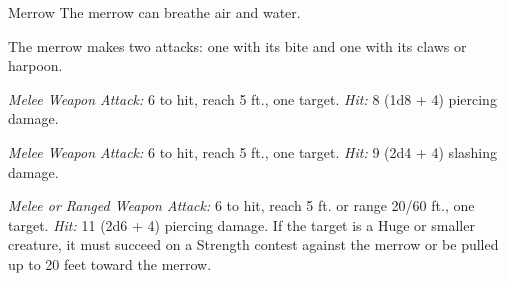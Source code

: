 \documentclass[10pt,a4paper,twoside,bg=print,twocolumn,openany,nodeprecatedcode]{dndbook}
\begin{document}
\begin{DndMonster}[float=t]{Merrow}
\DndMonsterBasics[
armor-class = {13 (natural armor)},
hit-points = {\DndDice{6d10 + 12}},
speed = {10 ft., swim 40 ft.}
]
\DndMonsterAbilityScores[
 str = 18,
 dex = 10,
 con = 15,
 int = 8,
 wis = 10,
 cha = 9
]
\DndMonsterDetails[
senses = {darkvision 60 ft., passive perception 10},
languages = {Abyssal, Aquan},
challenge = 2,
]
The merrow can breathe air and water.

The merrow makes two attacks: one with its bite and one with its claws or harpoon.

\textsl{Melee Weapon Attack:} 6 to hit, reach 5 ft., one target. \textsl{Hit:} 8 (1d8 + 4) piercing damage.

\textsl{Melee Weapon Attack:} 6 to hit, reach 5 ft., one target. \textsl{Hit:} 9 (2d4 + 4) slashing damage.

\textsl{Melee or Ranged Weapon Attack:} 6 to hit, reach 5 ft. or range 20/60 ft., one target. \textsl{Hit:} 11 (2d6 + 4) piercing damage. If the target is a Huge or smaller creature, it must succeed on a Strength contest against the merrow or be pulled up to 20 feet toward the merrow.

\end{DndMonster}
\end{document}
